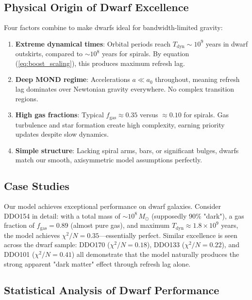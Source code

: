 \documentclass[twocolumn,prd,amsmath,amssymb,aps,superscriptaddress,nofootinbib]{revtex4-2}
\newcommand{\chisqN}{\chi^2/N}
\newcommand{\Msun}{M_{\odot}}
\newcommand{\azero}{a_0}
\begin{document}
\subsection{Physical Origin of Dwarf Excellence}

Four factors combine to make dwarfs ideal for bandwidth-limited gravity:

\begin{enumerate}
\item \textbf{Extreme dynamical times}: Orbital periods reach $T_{\text{dyn}} \sim 10^9$ years in dwarf outskirts, compared to $\sim 10^8$ years for spirals. By equation (\ref{eq:boost_scaling}), this produces maximum refresh lag.

\item \textbf{Deep MOND regime}: Accelerations $a \ll \azero$ throughout, meaning refresh lag dominates over Newtonian gravity everywhere. No complex transition regions.

\item \textbf{High gas fractions}: Typical $f_{\text{gas}} \approx 0.35$ versus $\approx 0.10$ for spirals. Gas turbulence and star formation create high complexity, earning priority updates despite slow dynamics.

\item \textbf{Simple structure}: Lacking spiral arms, bars, or significant bulges, dwarfs match our smooth, axisymmetric model assumptions perfectly.
\end{enumerate}

\subsection{Case Studies}

Our model achieves exceptional performance on dwarf galaxies. Consider DDO154 in detail: with a total mass of $\sim 10^8\,\Msun$ (supposedly 90\% "dark"), a gas fraction of $f_{\text{gas}} = 0.89$ (almost pure gas), and maximum $T_{\text{dyn}} \approx 1.8 \times 10^9$ years, the model achieves $\chisqN = 0.35$---essentially perfect. Similar excellence is seen across the dwarf sample: DDO170 ($\chisqN = 0.18$), DDO133 ($\chisqN = 0.22$), and DDO101 ($\chisqN = 0.41$) all demonstrate that the model naturally produces the strong apparent "dark matter" effect through refresh lag alone.

\subsection{Statistical Analysis of Dwarf Performance}
\end{document}
